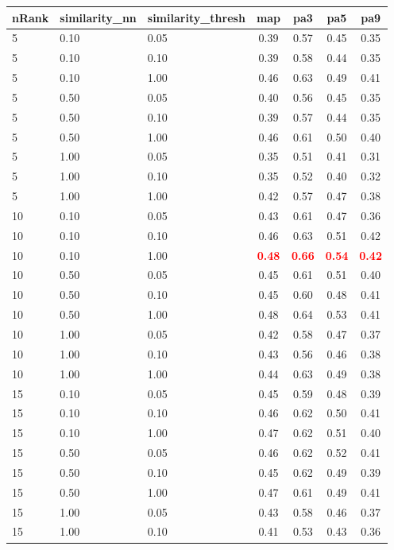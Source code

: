 \begin{tabular}{lllcccc} 
nRank & similarity\_nn & similarity\_thresh & map & pa3 & pa5 & pa9 \\ 
\hline 
 5 & 0.10 & 0.05 & 0.39 & 0.57 & 0.45 & 0.35 \\ 
 5 & 0.10 & 0.10 & 0.39 & 0.58 & 0.44 & 0.35 \\ 
 5 & 0.10 & 1.00 & 0.46 & 0.63 & 0.49 & 0.41 \\ 
 5 & 0.50 & 0.05 & 0.40 & 0.56 & 0.45 & 0.35 \\ 
 5 & 0.50 & 0.10 & 0.39 & 0.57 & 0.44 & 0.35 \\ 
 5 & 0.50 & 1.00 & 0.46 & 0.61 & 0.50 & 0.40 \\ 
 5 & 1.00 & 0.05 & 0.35 & 0.51 & 0.41 & 0.31 \\ 
 5 & 1.00 & 0.10 & 0.35 & 0.52 & 0.40 & 0.32 \\ 
 5 & 1.00 & 1.00 & 0.42 & 0.57 & 0.47 & 0.38 \\ 
10 & 0.10 & 0.05 & 0.43 & 0.61 & 0.47 & 0.36 \\ 
10 & 0.10 & 0.10 & 0.46 & 0.63 & 0.51 & 0.42 \\ 
10 & 0.10 & 1.00 & \textbf{\textcolor{red}{0.48}} & \textbf{\textcolor{red}{0.66}} & \textbf{\textcolor{red}{0.54}} & \textbf{\textcolor{red}{0.42}} \\ 
10 & 0.50 & 0.05 & 0.45 & 0.61 & 0.51 & 0.40 \\ 
10 & 0.50 & 0.10 & 0.45 & 0.60 & 0.48 & 0.41 \\ 
10 & 0.50 & 1.00 & 0.48 & 0.64 & 0.53 & 0.41 \\ 
10 & 1.00 & 0.05 & 0.42 & 0.58 & 0.47 & 0.37 \\ 
10 & 1.00 & 0.10 & 0.43 & 0.56 & 0.46 & 0.38 \\ 
10 & 1.00 & 1.00 & 0.44 & 0.63 & 0.49 & 0.38 \\ 
15 & 0.10 & 0.05 & 0.45 & 0.59 & 0.48 & 0.39 \\ 
15 & 0.10 & 0.10 & 0.46 & 0.62 & 0.50 & 0.41 \\ 
15 & 0.10 & 1.00 & 0.47 & 0.62 & 0.51 & 0.40 \\ 
15 & 0.50 & 0.05 & 0.46 & 0.62 & 0.52 & 0.41 \\ 
15 & 0.50 & 0.10 & 0.45 & 0.62 & 0.49 & 0.39 \\ 
15 & 0.50 & 1.00 & 0.47 & 0.61 & 0.49 & 0.41 \\ 
15 & 1.00 & 0.05 & 0.43 & 0.58 & 0.46 & 0.37 \\ 
15 & 1.00 & 0.10 & 0.41 & 0.53 & 0.43 & 0.36 \\ 

\end{tabular}
